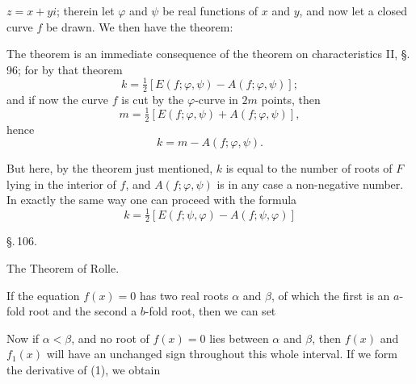 $z = x + yi$; therein let $\varphi$ and $\psi$ be real functions of $x$ and
$y$, and now let a closed curve $f$ be drawn. We then have the theorem:


The theorem is an immediate consequence of the theorem on characteristics II,
\S.\,96; for by that theorem
\[
k = \tfrac{1}{2}[E(f;\varphi,\psi) - A(f;\varphi,\psi)];
\]
and if now the curve $f$ is cut by the $\varphi$-curve in $2m$ points,
then
\[
m = \tfrac{1}{2}[E(f;\varphi,\psi) + A(f;\varphi,\psi)],
\]
hence
\[
k = m - A(f;\varphi,\psi).
\]

But here, by the theorem just mentioned, $k$ is equal to the number of roots
of $F$ lying in the interior of $f$, and $A(f;\varphi,\psi)$ is in any case a
non-negative number. In exactly the same way one can proceed with the formula
\[
k = \tfrac{1}{2}[E(f;\psi,\varphi) - A(f;\psi,\varphi)]
\]

\begin{center}
\S.\,106.

The Theorem of Rolle.
\end{center}

If the equation $f(x) = 0$ has two real roots $\alpha$ and $\beta$, of which
the first is an $a$-fold root and the second a $b$-fold root, then we can
set

Now if $\alpha < \beta$, and no root of $f(x) = 0$ lies between $\alpha$ and
$\beta$, then $f(x)$ and $f_1(x)$ will have an unchanged sign throughout
this whole interval. If we form the derivative of (1), we obtain
